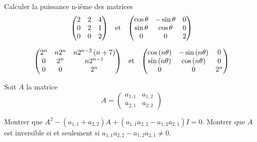 \documentclass{magnolia}
\begin{document}
Calculer la puissance n-ième des matrices
  \[\begin{pmatrix}
    2 & 2 & 4\\
    0 & 2 & 1\\
    0 & 0 & 2
    \end{pmatrix} \quad\!\text{et}\quad\!
    \begin{pmatrix}
    \cos \theta & -\sin \theta & 0\\
    \sin \theta & \cos \theta & 0\\
    0 & 0 & 2
    \end{pmatrix}\]
\begin{sol}
\[\begin{pmatrix}
  2^n & n2^n & n2^{n-2}\left(n+7\right)\\
  0 & 2^n & n2^{n-1} \\
  0 & 0 & 2^n
  \end{pmatrix} \quad\!\text{et}\quad\!
  \begin{pmatrix}
  \cos\left(n\theta\right) & -\sin\left(n\theta\right) & 0\\
  \sin\left(n\theta\right) & \cos\left(n\theta\right) & 0\\
  0 & 0 & 2^n
  \end{pmatrix}\]
\end{sol}




Soit $A$ la matrice
\[A=\begin{pmatrix}
    a_{1,1} & a_{1,2}\\
    a_{2,1} & a_{2,2}
  \end{pmatrix}\]
\begin{questions}
\question Montrer que $A^2-(a_{1,1}+a_{2,2})A+(a_{1,1}a_{2,2}-a_{1,2}a_{2,1})I=0$.
\question Montrer que $A$ est
  inversible si et seulement si $a_{1,1}a_{2,2}-a_{1,2}a_{2,1}\neq 0$. 
\end{questions}






\end{document}
